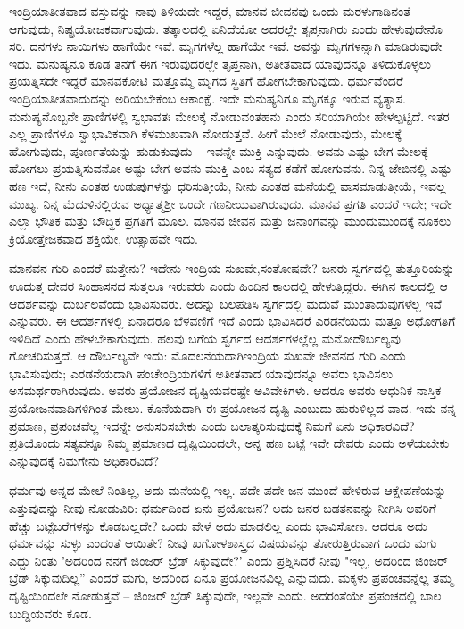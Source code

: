 ಇಂದ್ರಿಯಾತೀತವಾದ ವಸ್ತುವನ್ನು ನಾವು ತಿಳಿಯದೇ ಇದ್ದರೆ, ಮಾನವ ಜೀವನವು ಒಂದು ಮರಳುಗಾಡಿನಂತೆ ಆಗುವುದು, ನಿಷ್ಪ್ರಯೋಜಕವಾಗುವುದು. ತತ್ಕಾಲದಲ್ಲಿ ಏನಿದೆಯೋ ಅದರಲ್ಲೇ ತೃಪ್ತನಾಗಿರು ಎಂದು ಹೇಳುವುದೇನೊ ಸರಿ. ದನಗಳು ನಾಯಿಗಳು ಹಾಗೆಯೇ ಇವೆ. ಮೃಗಗಳೆಲ್ಲ ಹಾಗೆಯೇ ಇವೆ. ಅವನ್ನು ಮೃಗಗಳನ್ನಾಗಿ ಮಾಡಿರುವುದೇ ಇದು. ಮನುಷ್ಯನೂ ಕೂಡ ತನಗೆ ಈಗ ಇರುವುದರಲ್ಲೇ ತೃಪ್ತನಾಗಿ, ಅತೀತವಾದ ಯಾವುದನ್ನೂ ತಿಳಿದುಕೊಳ್ಳಲು ಪ್ರಯತ್ನಿಸದೇ ಇದ್ದರೆ ಮಾನವಕೋಟಿ ಮತ್ತೊಮ್ಮೆ ಮೃಗದ ಸ್ಥಿತಿಗೆ ಹೋಗಬೇಕಾಗುವುದು. ಧರ್ಮವೆಂದರೆ ಇಂದ್ರಿಯಾತೀತವಾದುದನ್ನು ಅರಿಯಬೇಕೆಂಬ ಆಕಾಂಕ್ಷೆ. ಇದೇ ಮನುಷ್ಯನಿಗೂ ಮೃಗಕ್ಕೂ ಇರುವ ವ್ಯತ್ಯಾಸ. ಮನುಷ್ಯನೊಬ್ಬನೇ ಪ್ರಾಣಿಗಳಲ್ಲಿ ಸ್ವಭಾವತಃ ಮೇಲಕ್ಕೆ ನೋಡುವಂತಹನು ಎಂದು ಸರಿಯಾಗಿಯೇ ಹೇಳಲ್ಪಟ್ಟಿದೆ. ಇತರ ಎಲ್ಲ ಪ್ರಾಣಿಗಳೂ ಸ್ವಾಭಾವಿಕವಾಗಿ ಕೆಳಮುಖವಾಗಿ ನೋಡುತ್ತವೆ. ಹೀಗೆ ಮೇಲೆ ನೋಡುವುದು, ಮೇಲಕ್ಕೆ ಹೋಗುವುದು, ಪೂರ್ಣತೆಯನ್ನು ಹುಡುಕುವುದು – ಇವನ್ನೇ ಮುಕ್ತಿ ಎನ್ನುವುದು. ಅವನು ಎಷ್ಟು ಬೇಗ ಮೇಲಕ್ಕೆ ಹೋಗಲು ಪ್ರಯತ್ನಿಸುವನೋ ಅಷ್ಟು ಬೇಗ ಅವನು ಮುಕ್ತಿ ಎಂಬ ಸತ್ಯದ ಕಡೆಗೆ ಹೋಗುವನು. ನಿನ್ನ ಜೇಬಿನಲ್ಲಿ ಎಷ್ಟು ಹಣ ಇದೆ, ನೀನು ಎಂತಹ ಉಡುಪುಗಳನ್ನು ಧರಿಸುತ್ತೀಯೆ, ನೀನು ಎಂತಹ ಮನೆಯಲ್ಲಿ ವಾಸಮಾಡುತ್ತೀಯೆ, ಇವಲ್ಲ ಮುಖ್ಯ. ನಿನ್ನ ಮೆದುಳಿನಲ್ಲಿರುವ ಅಧ್ಯಾತ್ಮಶ‍್ರೀ ಒಂದೇ ಗಣನೀಯವಾಗಿರುವುದು. ಮಾನವ ಪ್ರಗತಿ ಎಂದರೆ ಇದೇ; ಇದೇ ಎಲ್ಲಾ ಭೌತಿಕ ಮತ್ತು ಬೌದ್ಧಿಕ ಪ್ರಗತಿಗೆ ಮೂಲ. ಮಾನವ ಜೀವನ ಮತ್ತು ಜನಾಂಗವನ್ನು ಮುಂದುಮುಂದಕ್ಕೆ ನೂಕಲು ಕ್ರಿಯೋತ್ತೇಜಕವಾದ ಶಕ್ತಿಯೇ, ಉತ್ಸಾಹವೇ ಇದು.

ಮಾನವನ ಗುರಿ ಎಂದರೆ ಮತ್ತೇನು? ಇದೇನು ಇಂದ್ರಿಯ ಸುಖವೇ,\break ಸಂತೋಷವೇ? ಜನರು ಸ್ವರ್ಗದಲ್ಲಿ ತುತ್ತೂರಿಯನ್ನು ಊದುತ್ತ ದೇವರ ಸಿಂಹಾಸನದ ಸುತ್ತಲೂ ಇರುವರು ಎಂದು ಹಿಂದಿನ ಕಾಲದಲ್ಲಿ ಹೇಳುತ್ತಿದ್ದರು. ಈಗಿನ ಕಾಲದಲ್ಲಿ ಆ ಆದರ್ಶವನ್ನು ದುರ್ಬಲವೆಂದು ಭಾವಿಸುವರು. ಅದನ್ನು ಬಲಪಡಿಸಿ ಸ್ವರ್ಗದಲ್ಲಿ ಮದುವೆ ಮುಂತಾದುವುಗಳೆಲ್ಲ ಇವೆ ಎನ್ನುವರು. ಈ ಆದರ್ಶಗಳಲ್ಲಿ ಏನಾದರೂ ಬೆಳವಣಿಗೆ ಇದೆ ಎಂದು ಭಾವಿಸಿದರೆ ಎರಡನೆಯದು ಮತ್ತೂ ಅಧೋಗತಿಗೆ ಇಳಿದಿದೆ ಎಂದು ಹೇಳಬೇಕಾಗುವುದು. ಹಲವು ಬಗೆಯ ಸ್ವರ್ಗದ ಆದರ್ಶಗಳಲ್ಲೆಲ್ಲ ಮನೋದೌರ್ಬಲ್ಯವು ಗೋಚರಿಸುತ್ತದೆ. ಆ ದೌರ್ಬಲ್ಯವೇ ಇದು: ಮೊದಲನೆಯದಾಗಿ\break ಇಂದ್ರಿಯ ಸುಖವೇ ಜೀವನದ ಗುರಿ ಎಂದು ಭಾವಿಸುವುದು; ಎರಡನೆಯದಾಗಿ ಪಂಚೇಂದ್ರಿಯಗಳಿಗೆ ಅತೀತವಾದ ಯಾವುದನ್ನೂ ಅವರು ಭಾವಿಸಲು ಅಸಮರ್ಥರಾಗಿರುವುದು. ಅವರು ಪ್ರಯೋಜನ ದೃಷ್ಟಿಯವರಷ್ಟೇ ಅವಿವೇಕಿಗಳು. ಆದರೂ ಅವರು ಆಧುನಿಕ ನಾಸ್ತಿಕ ಪ್ರಯೋಜನವಾದಿಗಳಿಗಿಂತ ಮೇಲು. ಕೊನೆಯದಾಗಿ ಈ ಪ್ರಯೋಜನ ದೃಷ್ಟಿ ಎಂಬುದು ಹುರುಳಿಲ್ಲದ ವಾದ. ಇದು ನನ್ನ ಪ್ರಮಾಣ, ಪ್ರಪಂಚವೆಲ್ಲ ಇದನ್ನೇ ಅನುಸರಿಸಬೇಕು ಎಂದು ಬಲಾತ್ಕರಿಸುವುದಕ್ಕೆ ನಿಮಗೆ ಏನು ಅಧಿಕಾರವಿದೆ? ಪ್ರತಿಯೊಂದು ಸತ್ಯವನ್ನೂ ನಿಮ್ಮ ಪ್ರಮಾಣದ ದೃಷ್ಟಿಯಿಂದಲೇ, ಅನ್ನ ಹಣ ಬಟ್ಟೆ ಇವೇ ದೇವರು ಎಂದು ಅಳೆಯಬೇಕು ಎನ್ನುವುದಕ್ಕೆ ನಿಮಗೇನು ಅಧಿಕಾರವಿದೆ?

ಧರ್ಮವು ಅನ್ನದ ಮೇಲೆ ನಿಂತಿಲ್ಲ, ಅದು ಮನೆಯಲ್ಲಿ ಇಲ್ಲ. ಪದೇ ಪದೇ ಜನ ಮುಂದೆ ಹೇಳಿರುವ ಆಕ್ಷೇಪಣೆಯನ್ನು ಎತ್ತುವುದನ್ನು ನೀವು ನೋಡುವಿರಿ: ಧರ್ಮದಿಂದ ಏನು ಪ್ರಯೋಜನ? ಅದು ಜನರ ಬಡತನವನ್ನು ನೀಗಿಸಿ ಅವರಿಗೆ ಹೆಚ್ಚು ಬಟ್ಟೆಬರೆಗಳನ್ನು ಕೊಡಬಲ್ಲದೇ? ಒಂದು ವೇಳೆ ಅದು ಮಾಡಲಿಲ್ಲ ಎಂದು ಭಾವಿಸೋಣ. ಆದರೂ ಅದು ಧರ್ಮವನ್ನು ಸುಳ್ಳು ಎಂದಂತೆ ಆಯಿತೇ? ನೀವು ಖಗೋಳಶಾಸ್ತ್ರದ ವಿಷಯವನ್ನು ತೋರುತ್ತಿರುವಾಗ ಒಂದು ಮಗು ಎದ್ದು ನಿಂತು 'ಅದರಿಂದ ನನಗೆ ಜಿಂಜರ್ ಬ್ರೆಡ್ ಸಿಕ್ಕುವುದೇ?' ಎಂದು ಪ್ರಶ್ನಿಸಿದರೆ ನೀವು "ಇಲ್ಲ, ಅದರಿಂದ ಜಿಂಜರ್ ಬ್ರೆಡ್ ಸಿಕ್ಕುವುದಿಲ್ಲ” ಎಂದರೆ ಮಗು, ಅದರಿಂದ ಏನೂ ಪ್ರಯೋಜನವಿಲ್ಲ ಎನ್ನುವುದು. ಮಕ್ಕಳು ಪ್ರಪಂಚವನ್ನೆಲ್ಲ ತಮ್ಮ ದೃಷ್ಟಿಯಿಂದಲೇ ನೋಡುತ್ತವೆ – ಜಿಂಜರ್ ಬ್ರೆಡ್ ಸಿಕ್ಕುವುದೇ, ಇಲ್ಲವೇ ಎಂದು. ಅದರಂತೆಯೇ ಪ್ರಪಂಚದಲ್ಲಿ ಬಾಲ ಬುದ್ದಿಯವರು ಕೂಡ.


